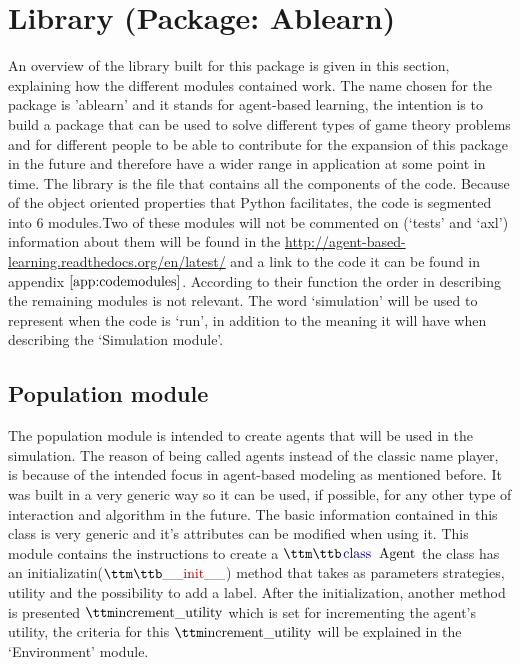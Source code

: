 \section{Library (Package: Ablearn)}\label{library_section}
An overview of the library built for this package is given in this section, explaining how the different modules contained work. The name chosen for the package is 'ablearn' and it stands for agent-based learning, the intention is to build a package that can be used to solve different types of game theory problems and for different people to be able to contribute for the expansion of this package in the future and therefore have a wider range in application at some point in time.
The library is the file that contains all the components of the code. Because of the object oriented properties that Python facilitates, the code is segmented into 6 modules.Two of these modules will not be commented on (`tests' and `axl')  information about them will be found in the \url{http://agent-based-learning.readthedocs.org/en/latest/} and a link to the code it can be found in appendix $\ref{app:codemodules}$. According to their function the order in describing the remaining modules is not relevant. The word `simulation' will be used to represent when the code is `run', in addition to the meaning it will have when describing the `Simulation module'.

\subsection{Population module}
The population module is intended to create agents that will be used in the simulation. The reason of being called agents instead of the classic name player, is because of the intended focus in agent-based modeling as mentioned before. It was built in a very generic way so it can be used, if possible, for any other type of interaction and algorithm in the future. The basic information contained in this class is very generic and it's attributes can be modified when using it. 
This module contains the instructions to create a $\pythoninline{class Agent}$ the class has an initializatin($\pythoninline{__init__}$) method that takes as parameters strategies, utility and the possibility to add a label. After the initialization, another method is presented $\pythoninline{increment\_utility}$ which is set for incrementing the agent’s utility, the criteria for this $\pythoninline{increment\_utility}$ will be explained in the `Environment' module.


